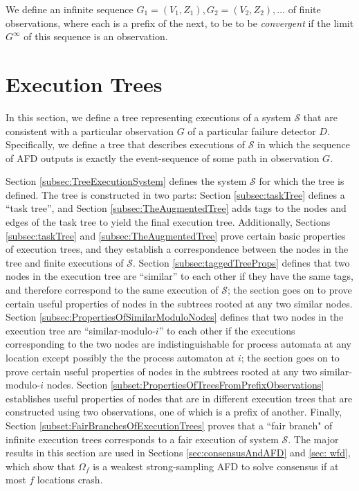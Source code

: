 \documentclass[11pt]{article}
\numberwithin{theorem}{section}
\newcommand{\FD}{D}
\begin{document}
We define an infinite sequence $G_1 = (V_1,Z_1), G_2 = (V_2,Z_2),
\ldots$ of finite observations, where each is a prefix of the next, to be to be \emph{convergent} if the limit $G^\infty$ of this sequence is an observation.

\section{Execution Trees}
\label{subsec:treeOfExec}

In this section, we define a tree representing executions of a system
$\mathcal{S}$ that are consistent with a particular observation $G$ of a
particular failure detector $\FD$.
Specifically, we define a tree that describes executions of
$\mathcal{S}$ in which the sequence of AFD outputs is exactly the event-sequence
of some path in observation $G$.

Section \ref{subsec:TreeExecutionSystem} defines the system $\mathcal{S}$ for which the tree is defined.
The tree is constructed in two parts: Section \ref{subsec:taskTree} defines a ``task tree'', and Section \ref{subsec:TheAugmentedTree} adds tags to the nodes and edges of the task tree to yield the final execution tree. Additionally, Sections \ref{subsec:taskTree}  and \ref{subsec:TheAugmentedTree} prove certain basic properties of execution trees, and they establish a correspondence between the nodes in the tree and finite executions of $\mathcal{S}$.
 Section \ref{subsec:taggedTreeProps} defines that two nodes in the execution tree are ``similar'' to each other if they have the same tags, and therefore correspond to the same execution of $\mathcal{S}$; the section goes on to prove certain useful properties of nodes in the subtrees rooted at any two similar nodes. 
 Section \ref{subsec:PropertiesOfSimilarModuloNodes} defines that two nodes in the execution tree are ``similar-modulo-$i$'' to each other if the executions corresponding to the two nodes are indistinguishable for process automata at any location except possibly the the process automaton at $i$; the section goes on to prove certain useful properties of nodes in the subtrees rooted at any two similar-modulo-$i$ nodes. 
 Section \ref{subset:PropertiesOfTreesFromPrefixObservations} establishes useful properties of nodes that are in different execution trees that are constructed using two observations, one of which is a prefix of another. Finally, Section \ref{subset:FairBranchesOfExecutionTrees} proves that a ``fair branch" of infinite execution trees corresponds to a fair execution of system $\mathcal{S}$. The major results in this section are used in Sections \ref{sec:consensusAndAFD} and \ref{sec: wfd}, which show that $\Omega_f$ is a weakest strong-sampling AFD to solve consensus if at most $f$ locations crash.
\end{document}
